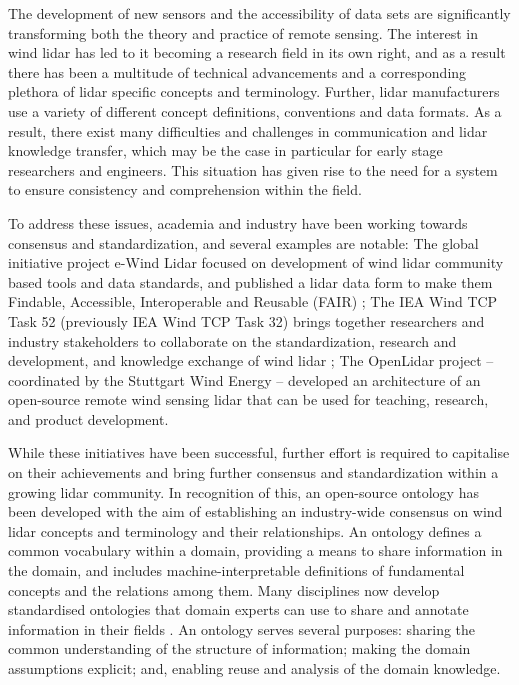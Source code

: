 \documentclass[remotesensing,article,submit,pdftex,moreauthors]{Definitions/mdpi}
\begin{document}
The development of new sensors and the accessibility of data sets are significantly transforming both the theory and practice of remote sensing.
The interest in wind lidar has led to it becoming a research field in its own right, and as a result there has been a multitude of technical advancements and a corresponding plethora of lidar specific concepts and terminology. 
Further, lidar manufacturers use a variety of different concept definitions, conventions and data formats.
As a result, there exist many difficulties and challenges in communication and lidar knowledge transfer, which may be the case in particular for early stage researchers and engineers. This situation has given rise to the need for a system to ensure consistency and comprehension within the field.

To address these issues, academia and industry have been working towards consensus and standardization, and several examples are notable:
The global initiative project e-Wind Lidar focused on development of wind lidar community based tools and data standards, and published a lidar data form to make them Findable, Accessible, Interoperable and Reusable (FAIR) \cite{ref-FAIR}; 
The IEA Wind TCP Task 52 (previously IEA Wind TCP Task 32) brings together researchers and industry stakeholders to collaborate on the standardization, research and development, and knowledge exchange of wind lidar \cite{ref-Clifton-Schlipf};
The OpenLidar project \cite{clifton_andrew_2019_3414197} -- coordinated by the Stuttgart Wind Energy -- developed an architecture of an open-source remote wind sensing lidar that can be used for teaching, research, and product development.

While these initiatives have been successful, further effort is required to capitalise on their achievements and bring further consensus and standardization within a growing lidar community.
In recognition of this, an open-source ontology has been developed with the aim of establishing an industry-wide consensus on wind lidar concepts and terminology and their relationships.
An ontology defines a common vocabulary within a domain, providing a means to share information in the domain, and includes machine-interpretable definitions of fundamental concepts and the relations among them.
Many disciplines now develop standardised ontologies that domain experts can use to share and annotate information in their fields \cite{ref-Noy}.
An ontology serves several purposes: sharing the common understanding of the structure of information; making the domain assumptions explicit; and, enabling reuse and analysis of the domain knowledge.
\end{document}
